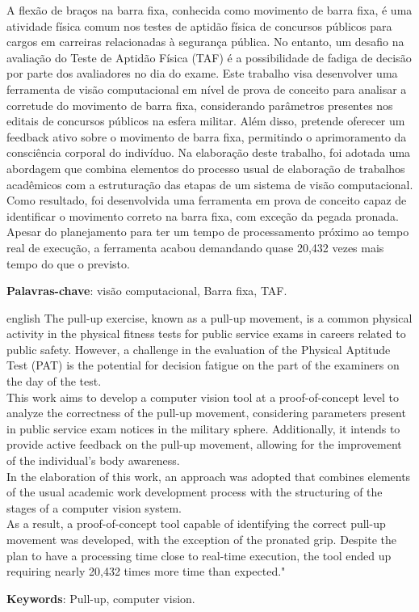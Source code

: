 \documentclass[
	12pt,			%
	openany,		%
	oneside,		%
	a4paper,		%
	english,		%
	brazil			%
	]{abntex2}
\begin{document}
\begin{resumo}
	A flexão de braços na barra fixa, conhecida como movimento de barra fixa, é uma atividade física comum nos testes de aptidão física de concursos públicos para cargos em carreiras relacionadas à segurança pública. No entanto, um desafio na avaliação do Teste de Aptidão Física (TAF) é a possibilidade de fadiga de decisão por parte dos avaliadores no dia do exame.
	Este trabalho visa desenvolver uma ferramenta de visão computacional em nível de prova de conceito para analisar a corretude do movimento de barra fixa, considerando parâmetros presentes nos editais de concursos públicos na esfera militar. Além disso, pretende oferecer um feedback ativo sobre o movimento de barra fixa, permitindo o aprimoramento da consciência corporal do indivíduo.
	Na elaboração deste trabalho, foi adotada uma abordagem que combina elementos do processo usual de elaboração de trabalhos acadêmicos com a estruturação das etapas de um sistema de visão computacional.
	Como resultado, foi desenvolvida uma ferramenta em prova de conceito capaz de identificar o movimento correto na barra fixa, com exceção da pegada pronada. Apesar do planejamento para ter um tempo de processamento próximo ao tempo real de execução, a ferramenta acabou demandando quase 20,432 vezes mais tempo do que o previsto.
 
 \textbf{Palavras-chave}: visão computacional, Barra fixa, TAF.
\end{resumo}

\begin{resumo}[Abstract]
 \begin{otherlanguage*}{english}
	The pull-up exercise, known as a pull-up movement, is a common physical activity in the physical fitness tests for public service exams in careers related to public safety. However, a challenge in the evaluation of the Physical Aptitude Test (PAT) is the potential for decision fatigue on the part of the examiners on the day of the test.\\
	This work aims to develop a computer vision tool at a proof-of-concept level to analyze the correctness of the pull-up movement, considering parameters present in public service exam notices in the military sphere. Additionally, it intends to provide active feedback on the pull-up movement, allowing for the improvement of the individual's body awareness.\\
	In the elaboration of this work, an approach was adopted that combines elements of the usual academic work development process with the structuring of the stages of a computer vision system.\\	
	As a result, a proof-of-concept tool capable of identifying the correct pull-up movement was developed, with the exception of the pronated grip. Despite the plan to have a processing time close to real-time execution, the tool ended up requiring nearly 20,432 times more time than expected."

 \textbf{Keywords}: Pull-up, computer vision.
 \end{otherlanguage*}
\end{resumo}
\end{document}
